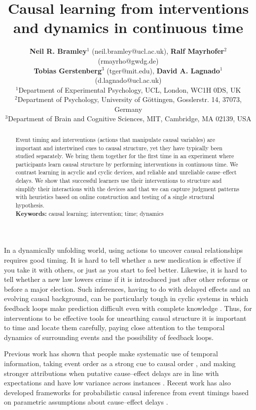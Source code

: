 \documentclass[10pt,letterpaper]{article}
\title{Causal learning from interventions and dynamics in continuous time}
\author{{\large \textbf{Neil R. Bramley$^1$} (neil.bramley@ucl.ac.uk)}, {\large \textbf{Ralf Mayrhofer$^2$} (rmayrho@gwdg.de)}\\{\large \textbf{Tobias Gerstenberg$^3$} (tger@mit.edu), {\large \textbf{David A. Lagnado$^1$} (d.lagnado@ucl.ac.uk)}}\\
{\small$^1$Department of Experimental Psychology, UCL, London, WC1H 0DS, UK}\\
{\small$^2$Department of Psychology, University of G{\"o}ttingen, Gosslerstr. 14, 37073, Germany}\\
{\small$^3$Department of Brain and Cognitive Sciences, MIT, Cambridge, MA 02139, USA}
}
\newcommand{\ttodo}[2][]
{\todo[caption={#2}, size=\small, #1, color = orange, inline]{\renewcommand{\baselinestretch}{1}\selectfont \textbf{TG}: #2}~}
\begin{document}
\maketitle

\begin{abstract}
Event timing and interventions (actions that manipulate causal variables) are important and intertwined cues to causal structure, yet they have typically been studied separately.  We bring them together for the first time in an experiment where participants learn causal structure by performing interventions in continuous time.  We contrast learning in acyclic and cyclic devices, and reliable and unreliable cause--effect delays.  We show that successful learners use their interventions to structure and simplify their interactions with the devices and that we can capture judgment patterns with heuristics based on online construction and testing of a single structural hypothesis.\\
\textbf{Keywords:} 
causal learning; intervention; time; dynamics
\end{abstract}


In a dynamically unfolding world, using actions to uncover causal relationships requires good timing.  It is hard to tell whether a new medication is effective if you take it with others, or just as you start to feel better.  Likewise, it is hard to tell whether a new law lowers crime if it is introduced just after other reforms or before a major election.  Such inferences, having to do with delayed effects and an evolving causal background, can be particularly tough in cyclic systems in which feedback loops make prediction difficult even with complete knowledge \citep{brehmer1992dynamic}.  Thus, for interventions to be effective tools for unearthing causal structure it is important to time and locate them carefully, paying close attention to the temporal dynamics of surrounding events and the possibility of feedback loops. 


Previous work has shown that people make systematic use of temporal information, taking event order as a strong cue to causal order \citep{bramley2014order}, and making stronger attributions when putative cause--effect delays are in line with expectations \citep{buehner2006temporal,hagmayer2002temporal} and have low variance across instances \citep{greville2010temporal}. Recent work has also developed frameworks for probabilistic causal inference from event timings based on parametric assumptions about cause--effect delays \citep{bramley2017time,pacer2015upsetting}.
\end{document}
